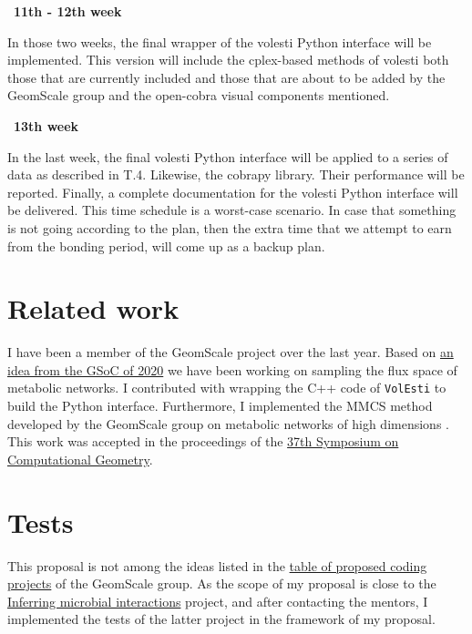 \documentclass{article}
\begin{document}
\textbullet\ \textbf{11th - 12th week}

In those two weeks, the final wrapper of the volesti Python interface will be implemented. This version will include the cplex-based methods of volesti both those that are currently included and those that are about to be added by the GeomScale group and the open-cobra visual components mentioned. 


\textbullet\ \textbf{13th week}

In the last week, the final  volesti Python interface will be applied to a series of data as described in T.4. Likewise, the cobrapy library. Their performance will be reported. Finally, a complete documentation for the volesti Python interface will be delivered.
This time schedule is a worst-case scenario. In case that something is not going according to the plan, then the extra time that we attempt to earn from the bonding period, will come up as a backup plan.













\section{Related work}

I have been a member of the GeomScale project over the last year.
Based on \href{https://github.com/GeomScale/gsoc2020/wiki/High-dimensional-sampling-with-applications-to-structural-biology}{an idea from the GSoC of 2020} we have been working on sampling the flux space of metabolic networks. 
I contributed with wrapping the C++ code of \texttt{VolEsti} to build the Python interface.
Furthermore, I implemented the MMCS method developed by the GeomScale group on metabolic networks of high dimensions \cite{chalkis2020geometric}. 
This work was accepted in the proceedings of the \href{https://cse.buffalo.edu/socg21/accepted.html}{37th Symposium on Computational Geometry}.



\section{Tests}
This proposal is not among the ideas listed in the 
\href{https://github.com/GeomScale/gsoc2021/wiki/table-of-proposed-coding-projects}{table of proposed coding projects} of the GeomScale group. 
As the scope of my proposal is close to the \href{https://github.com/GeomScale/gsoc2021/wiki/Inferring-microbial-interactions}{Inferring microbial interactions} project, 
and after contacting the mentors, 
I implemented the tests of the latter project in the framework of my proposal.
\end{document}

